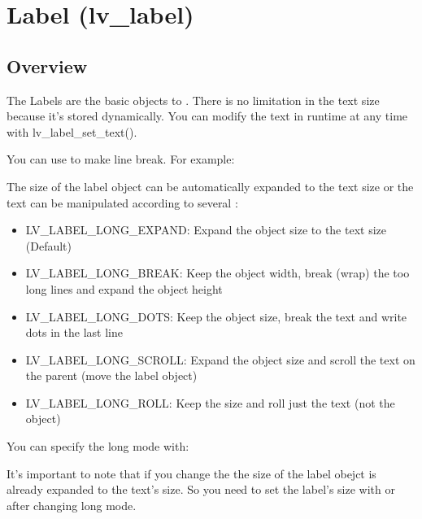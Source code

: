 \documentclass[letterpaper,10pt,english]{sphinxmanual}
\begin{document}
\section{Label (lv\_label)}
\label{\detokenize{object-types/label:label-lv-label}}\label{\detokenize{object-types/label::doc}}

\subsection{Overview}
\label{\detokenize{object-types/label:overview}}
The Labels are the basic objects to . There is no limitation in the text size because it’s stored dynamically. You can modify the text in runtime at any time with lv\_label\_set\_text().

You can use  to make line break. For example: 

The size of the label object can be automatically expanded to the text size or the text can be manipulated according to several :
\begin{itemize}
\item {} 
LV\_LABEL\_LONG\_EXPAND: Expand the object size to the text size (Default)

\item {} 
LV\_LABEL\_LONG\_BREAK: Keep the object width, break (wrap) the too long lines and expand the object height

\item {} 
LV\_LABEL\_LONG\_DOTS: Keep the object size, break the text and write dots in the last line

\item {} 
LV\_LABEL\_LONG\_SCROLL: Expand the object size and scroll the text on the parent (move the label object)

\item {} 
LV\_LABEL\_LONG\_ROLL: Keep the size and roll just the text (not the object)

\end{itemize}

You can specify the long mode with: 

It’s important to note that if you change the  the size of the label obejct is already expanded to the text’s size.
So you need to set the label’s size with  or  after changing long mode.
\end{document}

